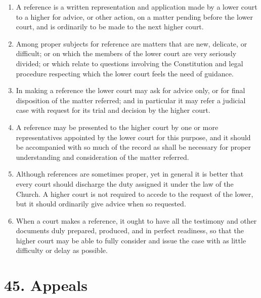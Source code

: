 \documentclass[
]{book}
\providecommand{\tightlist}{%
  \setlength{\itemsep}{0pt}\setlength{\parskip}{0pt}}
\begin{document}
\begin{enumerate}
\def\labelenumi{\arabic{enumi}.}
\tightlist
\item
  \protect\hypertarget{44}{\href{}{}}A reference is a written representation and application made by a lower court to a higher for advice, or other action, on a matter pending before the lower court, and is ordinarily to be made to the next higher court.
\item
  Among proper subjects for reference are matters that are new, delicate, or difficult; or on which the members of the lower court are very seriously divided; or which relate to questions involving the Constitution and legal procedure respecting which the lower court feels the need of guidance.
\item
  \protect\hypertarget{44.3}{\href{}{}}In making a reference the lower court may ask for advice only, or for final disposition of the matter referred; and in particular it may refer a judicial case with request for its trial and decision by the higher court.
\item
  A reference may be presented to the higher court by one or more representatives appointed by the lower court for this purpose, and it should be accompanied with so much of the record as shall be necessary for proper understanding and consideration of the matter referred.
\item
  Although references are sometimes proper, yet in general it is better that every court should discharge the duty assigned it under the law of the Church. A higher court is not required to accede to the request of the lower, but it should ordinarily give advice when so requested.
\item
  When a court makes a reference, it ought to have all the testimony and other documents duly prepared, produced, and in perfect readiness, so that the higher court may be able to fully consider and issue the case with as little difficulty or delay as possible.
\end{enumerate}

\hypertarget{appeals}{%
\section*{45. Appeals}\label{appeals}}

\protect\hypertarget{chapter-slug-45-appeals}{\href{}{}}
\end{document}
